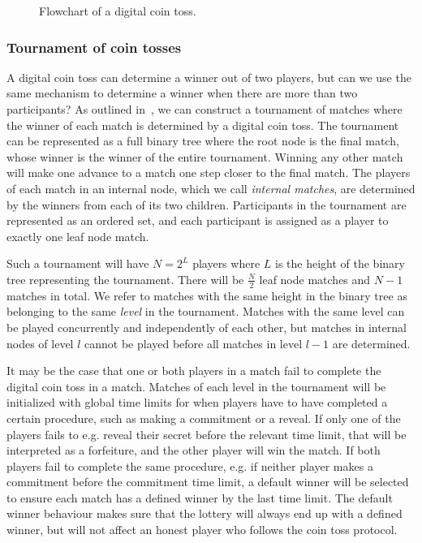 \begin{figure}[htbp]
  \centering
  
  \caption{Flowchart of a digital coin toss.}
  \label{fig:digital-coin-toss-flow}
\end{figure}

\subsubsection{Tournament of coin tosses}
A digital coin toss can determine a winner out of two players, but can we use the same mechanism to determine a winner when there are more than two participants? As outlined in~\cite{miller_zero-collateral_2017,bartoletti_constant-deposit_2017}, we can construct a tournament of matches where the winner of each match is determined by a digital coin toss. The tournament can be represented as a full binary tree where the root node is the final match, whose winner is the winner of the entire tournament. Winning any other match will make one advance to a match one step closer to the final match. The players of each match in an internal node, which we call \emph{internal matches}, are determined by the winners from each of its two children. Participants in the tournament are represented as an ordered set, and each participant is assigned as a player to exactly one leaf node match. 

Such a tournament will have $N=2^L$ players where $L$ is the height of the binary tree representing the tournament. There will be $\frac{N}{2}$ leaf node matches and $N-1$ matches in total. We refer to matches with the same height in the binary tree as belonging to the same \emph{level} in the tournament. Matches with the same level can be played concurrently and independently of each other, but matches in internal nodes of level $l$ cannot be played before all matches in level $l-1$ are determined.

It may be the case that one or both players in a match fail to complete the digital coin toss in a match. Matches of each level in the tournament will be initialized with global time limits for when players have to have completed a certain procedure, such as making a commitment or a reveal. If only one of the players fails to e.g. reveal their secret before the relevant time limit, that will be interpreted as a forfeiture, and the other player will win the match. If both players fail to complete the same procedure, e.g. if neither player makes a commitment before the commitment time limit, a default winner will be selected to ensure each match has a defined winner by the last time limit. The default winner behaviour makes sure that the lottery will always end up with a defined winner, but will not affect an honest player who follows the coin toss protocol.


